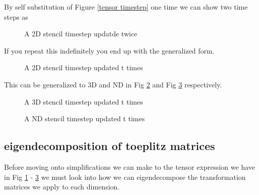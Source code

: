 \documentclass{article}
\begin{document}
By self substitution of Figure \ref{tensor timestep} one time we can show two time steps as

\begin{figure}[H]
	\begin{mdframed}[backgroundcolor=myFigureColour]
		
		\caption{A 2D stencil timestep updatde twice}
	\end{mdframed}
\end{figure}

If you repeat this indefinitely you end up with the generalized form.

\begin{figure}[H]
	\begin{mdframed}[backgroundcolor=myFigureColour]
		
		\caption{A 2D stencil timestep updated t times}
		\label{tensor timestep 2D}
	\end{mdframed}
\end{figure}

This can be generalized to 3D and ND in Fig \ref{tensor timestep 3D} and Fig \ref{tensor timestep ND} respectively.


\begin{figure}[H]
	\begin{mdframed}[backgroundcolor=myFigureColour]
		
		\caption{A 3D stencil timestep updated t times}
		\label{tensor timestep 3D}
	\end{mdframed}
\end{figure}

\begin{figure}[H]
	\begin{mdframed}[backgroundcolor=myFigureColour]
		
		\caption{A ND stencil timestep updated t times}
		\label{tensor timestep ND}
	\end{mdframed}
\end{figure}

\subsection{eigendecomposition of toeplitz matrices}

Before moving onto simplifications we can make to the tensor expression we have in Fig \ref{tensor timestep 2D} - \ref{tensor timestep ND} we must look into how we can eigendecompose the transformation matrices we apply to each dimension.
\end{document}
